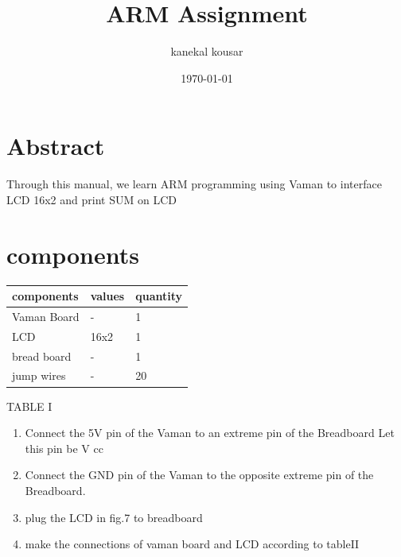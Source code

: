 \documentclass[twocolumn,13pt]{article}
\begin{document}
\title{\textbf{ARM Assignment}}

\author{kanekal kousar}
\date{\today}
\maketitle
\section*{Abstract}
  Through this manual, we learn ARM programming using Vaman to interface LCD 16x2 and print SUM on LCD
\section*{components}
     \begin{tabular}{ |p{3cm}|p{1.5cm}|p{1.5cm}| }
 \hline
 \setlength{\tabcolsep}{3pt}
components & values & quantity \\
\hline
 Vaman Board &   - & 1\\
 LCD &16x2 & 1\\
 bread board  &-& 1\\
 jump wires&  - & 20\\
 \hline
\end{tabular}
\begin{center}
    TABLE I
\end{center}

\begin{enumerate}
    \item Connect the 5V pin of the Vaman to an extreme pin of the Breadboard Let this pin be V cc 
    \item Connect the GND pin of the Vaman to the opposite extreme pin of the Breadboard.
     \item plug the LCD in fig.7 to breadboard
    \item make the connections of vaman board and LCD according to tableII
   
\end{enumerate}
\end{document}
